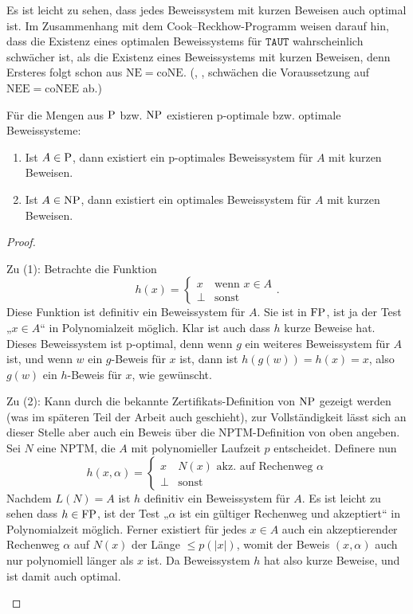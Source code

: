 Es ist leicht zu sehen, dass jedes Beweissystem mit kurzen Beweisen auch optimal ist. Im Zusammenhang mit dem Cook–Reckhow-Programm weisen \textcite{krajicek_propositional_1989} darauf hin, dass die Existenz eines optimalen Beweissystems für $\mathtt{TAUT}$ wahrscheinlich schwächer ist, als die Existenz eines Beweissystems mit kurzen Beweisen, denn Ersteres folgt schon aus $\mathrm{NE}=\mathrm{coNE}$. (\citeauthor{kobler_optimal_2003}, \citeyear{kobler_optimal_2003}, schwächen die Voraussetzung auf $\mathrm{NEE=coNEE}$ ab.)

Für die Mengen aus $\P$ bzw. $\NP$ existieren p-optimale bzw. optimale Beweissysteme:
\begin{observation}\label{obs:np-short-ps}
    \begin{enumerate}
        \item Ist $A\in \P$, dann existiert ein p-optimales Beweissystem für $A$ mit kurzen Beweisen.
        \item Ist $A\in \NP$, dann existiert ein optimales Beweissystem für $A$ mit kurzen Beweisen.
    \end{enumerate}
\end{observation}
\begin{proof}
\begin{prooflist}
\item Zu (1): Betrachte die Funktion
    \[ h(x) = \begin{cases} x & \text{wenn $x\in A$} \\ \bot & \text{sonst} \end{cases}. \]
    Diese Funktion ist definitiv ein Beweissystem für $A$. Sie ist in $\FP$, ist ja der Test „$x\in A$“ in Polynomialzeit möglich. Klar ist auch dass $h$ kurze Beweise hat. Dieses Beweissystem ist p-optimal, denn wenn $g$ ein weiteres Beweissystem für $A$ ist, und wenn $w$ ein $g$-Beweis für $x$ ist, dann ist $h(g(w))=h(x)=x$, also $g(w)$ ein $h$-Beweis für $x$, wie gewünscht. 

\item Zu (2): Kann durch die bekannte Zertifikats-Definition von $\NP$ gezeigt werden (was im späteren Teil der Arbeit auch geschieht), zur Vollständigkeit lässt sich an dieser Stelle aber auch ein Beweis über die NPTM-Definition von oben angeben. Sei $N$ eine NPTM, die $A$ mit polynomieller Laufzeit $p$ entscheidet.
    Definere nun
    \[ h(x, \alpha) = \begin{cases} x & \text{$N(x)$ akz. auf Rechenweg $\alpha$} \\ \bot & \text{sonst} \end{cases} \]
    Nachdem $L(N)=A$ ist $h$ definitiv ein Beweissystem für $A$. Es ist leicht zu sehen dass $h\in\FP$, ist der Test „$\alpha$ ist ein gültiger Rechenweg und akzeptiert“ in Polynomialzeit möglich. Ferner existiert für jedes $x\in A$ auch ein akzeptierender Rechenweg $\alpha$ auf $N(x)$ der Länge $\leq p(|x|)$, womit der Beweis $(x, \alpha)$ auch nur polynomiell länger als $x$ ist. Da Beweissystem $h$ hat also kurze Beweise, und ist damit auch optimal.
\end{prooflist}
\end{proof}
